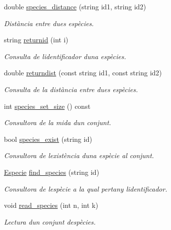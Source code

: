 \begin{DoxyCompactItemize}
double \hyperlink{class_cjt___especies_abf55093b325fd101ef73aa18dd1cf823}{species\+\_\+distance} (string id1, string id2)
\begin{DoxyCompactList}\small\item\em Distància entre dues espècies. \end{DoxyCompactList}\item 
string \hyperlink{class_cjt___especies_af33bf6763e518251a77642136064bdbf}{returnid} (int i)
\begin{DoxyCompactList}\small\item\em Consulta de l\textquotesingle{}identificador d\textquotesingle{}una espècies. \end{DoxyCompactList}\item 
double \hyperlink{class_cjt___especies_ae13d0a3a9f8b0ed9bba78b1c6c9d4eaa}{returndist} (const string id1, const string id2)
\begin{DoxyCompactList}\small\item\em Consulta de la distància entre dues espècies. \end{DoxyCompactList}\item 
int \hyperlink{class_cjt___especies_a011e96e195dfe5997d42e7937fe2099c}{species\+\_\+set\+\_\+size} () const
\begin{DoxyCompactList}\small\item\em Consultora de la mida d\textquotesingle{}un conjunt. \end{DoxyCompactList}\item 
bool \hyperlink{class_cjt___especies_a2ce9d7a4968d46686109477f448857ea}{species\+\_\+exist} (string id)
\begin{DoxyCompactList}\small\item\em Consultora de l\textquotesingle{}existència d\textquotesingle{}una espècie al conjunt. \end{DoxyCompactList}\item 
\hyperlink{class_especie}{Especie} \hyperlink{class_cjt___especies_a1e01bf8dfbde0983404efba05bd1b4b3}{find\+\_\+species} (string id)
\begin{DoxyCompactList}\small\item\em Consultora de l\textquotesingle{}espècie a la qual pertany l\textquotesingle{}identificador. \end{DoxyCompactList}\item 
void \hyperlink{class_cjt___especies_a273156c50e67be8815bdd1c31cc1661a}{read\+\_\+species} (int n, int k)
\begin{DoxyCompactList}\small\item\em Lectura d\textquotesingle{}un conjunt d\textquotesingle{}espècies. \end{DoxyCompactList}\item 

\end{DoxyCompactItemize}
